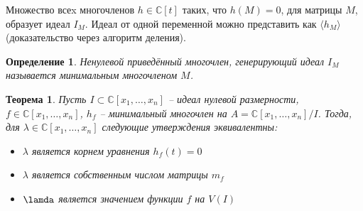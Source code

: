 \documentclass[notheorems,aspectratio=169]{beamer}
\newtheorem{theorem}{Теорема}
\newtheorem{definition}{Определение}
\begin{document}
\begin{frame}
    Множество всеx многочленов $h\in\mathbb{C}[t]$ таких, что $h(M) = 0$, для матрицы $M$, образует идеал $I_M$. Идеал от одной переменной можно представить как $\langle h_M\rangle$(доказательство через алгоритм деления). 
    \begin{definition}
    Ненулевой приведённый многочлен, генерирующий идеал $I_M$ называется минимальным многочленом $M$. 
    \end{definition}
    \begin{theorem}
        Пусть $I\subset\mathbb{C}[x_1,\dots, x_n]$ -- идеал нулевой размерности,
        $f \in\mathbb{C}[x_1,\dots, x_n] $,
        $h_f$ -- минимальный многочлен на $A = \mathbb{C}[x_1,\dots, x_n]/I$.
        Тогда, для $\lambda\in\mathbb{C}[x_1,\dots, x_n]$ следующие утверждения эквивалентны:
        \begin{itemize}
            \item [(i)] $\lambda$ является корнем уравнения $h_f(t) = 0$
            \item [(ii)] $\lambda$ является собственным числом матрицы $m_f$
            \item [(iii)] $\lamda$ является значением функции $f$ на $V(I)$
        \end{itemize}
    \end{theorem}
\end{frame}

    
    
\end{document}
